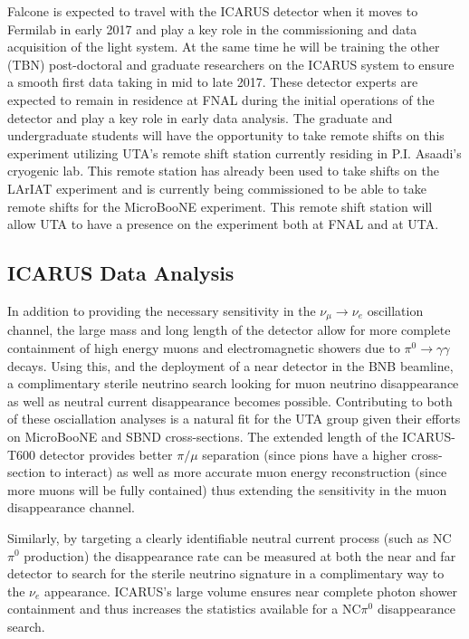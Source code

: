 Falcone is expected to travel with the ICARUS detector when it moves to Fermilab in early 2017 and play a key role in the commissioning and data acquisition of the light system. At the same time he will be training the other (TBN) post-doctoral and graduate researchers on the ICARUS system to ensure a smooth first data taking in mid to late 2017. These detector experts are expected to remain in residence at FNAL during the initial operations of the detector and play a key role in early data analysis. The graduate and undergraduate students will have the opportunity to take remote shifts on this experiment utilizing UTA's remote shift station currently residing in P.I. Asaadi's cryogenic lab. This remote station has already been used to take shifts on the LArIAT experiment and is currently being commissioned to be able to take remote shifts for the MicroBooNE experiment. This remote shift station will allow UTA to have a presence on the experiment both at FNAL and at UTA.

\subsection{ICARUS Data Analysis}\label{sec:ICARUSDataAnalysis}
In addition to providing the necessary sensitivity in the $\nu_{\mu} \rightarrow \nu_{e}$ oscillation channel, the large mass and long length of the detector allow for more complete containment of high energy muons and electromagnetic showers due to $\pi^{0} \rightarrow \gamma \gamma$ decays. Using this, and the deployment of a near detector in the BNB beamline, a complimentary sterile neutrino search looking for muon neutrino disappearance as well as neutral current disappearance becomes possible. Contributing to both of these osciallation analyses is a natural fit for the UTA group given their efforts on MicroBooNE and SBND cross-sections. The extended length of the ICARUS-T600 detector provides better $\pi / \mu$ separation (since pions have a higher cross-section to interact) as well as more accurate muon energy reconstruction (since more muons will be fully contained) thus extending the sensitivity in the muon disappearance channel. 

Similarly, by targeting a clearly identifiable neutral current process (such as NC$\pi^{0}$ production) the disappearance rate can be measured at both the near and far detector to search for the sterile neutrino signature in a complimentary way to the $\nu_{e}$ appearance. ICARUS's large volume ensures near complete photon shower containment and thus increases the statistics available for a NC$\pi^{0}$ disappearance search.

